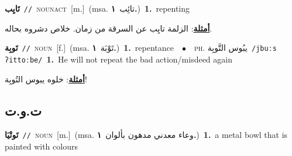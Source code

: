 \documentclass[10pt,a4paper,twoside]{article} %
\begin{document}
\begin{multicols}{2}
{\setlength\topsep{0pt}\textbf{\foreignlanguage{arabic}{تَايِب}}\ {\color{gray}\texttt{//}\color{black}}\ \textsc{noun\textunderscore act}\ [m.]\ \color{gray}(msa. \foreignlanguage{arabic}{تائِب}~\foreignlanguage{arabic}{\textbf{١.}})\color{black}\ \textbf{1.}~repenting\  \begin{flushright}\color{gray}\foreignlanguage{arabic}{\textbf{\underline{\foreignlanguage{arabic}{أمثلة}}}: الزلمة تايِب عن السرقة من زمان. خلاص دشروه بحاله.}\end{flushright}\color{black}} \vspace{2mm}

{\setlength\topsep{0pt}\textbf{\foreignlanguage{arabic}{تَوبِة}}\ {\color{gray}\texttt{//}\color{black}}\ \textsc{noun}\ [f.]\ \color{gray}(msa. \foreignlanguage{arabic}{تَوْبَة}~\foreignlanguage{arabic}{\textbf{١.}})\color{black}\ \textbf{1.}~repentance\ \ $\bullet$\ \ \textsc{ph.} \color{gray} \foreignlanguage{arabic}{يبُوس التَّوبِة}\color{black}\ {\color{gray}\texttt{/{\sffamily jbuːs ʔittoːbe}/}\color{black}}\ \textbf{1.}~He will not repeat the bad action/misdeed  again\  \begin{flushright}\color{gray}\foreignlanguage{arabic}{\textbf{\underline{\foreignlanguage{arabic}{أمثلة}}}: خلوه يبوس التُوبِة!}\end{flushright}\color{black}} \vspace{2mm}

\vspace{-3mm}
\subsection*{\color{blue}\foreignlanguage{arabic}{ت.و.ت}\color{blue}{}} 

{\setlength\topsep{0pt}\textbf{\foreignlanguage{arabic}{تَوتْيَا}}\ {\color{gray}\texttt{//}\color{black}}\ \textsc{noun}\ [m.]\ \color{gray}(msa. \foreignlanguage{arabic}{وعاء معدني مدهون بألوان}~\foreignlanguage{arabic}{\textbf{١.}})\color{black}\ \textbf{1.}~a metal bowl that is painted with colours\ } \vspace{2mm}


\end{multicols}
\end{document}
